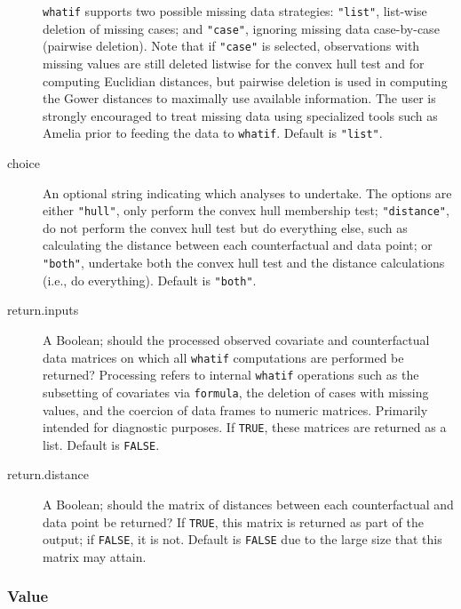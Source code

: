 \documentclass[oneside,letterpaper,titlepage]{article}
\begin{document}
\begin{description}
  \texttt{whatif} supports two possible missing data strategies:
  \texttt{"list"}, list-wise deletion of missing cases; and
  \texttt{"case"}, ignoring missing data case-by-case (pairwise
  deletion).  Note that if \texttt{"case"} is selected, observations
  with missing values are still deleted listwise for the convex hull
  test and for computing Euclidian distances, but pairwise deletion is
  used in computing the Gower distances to maximally use available
  information. The user is strongly encouraged to treat missing data
  using specialized tools such as Amelia prior to feeding the data to
  \texttt{whatif}.  Default is \texttt{"list"}.
\item[choice] An optional string indicating which analyses to 
  undertake. The options are either \texttt{"hull"}, only perform the convex hull 
  membership test; \texttt{"distance"}, do not perform the convex
  hull test but do everything else, such as calculating the distance between
  each counterfactual and data point; or \texttt{"both"}, undertake both the
  convex hull test and the distance calculations (i.e., do everything).
  Default is \texttt{"both"}.
\item[return.inputs] A Boolean; should the processed observed
  covariate and counterfactual data matrices on which all
  \texttt{whatif} computations are performed be returned?  Processing
  refers to internal \texttt{whatif} operations such as the subsetting
  of covariates via \texttt{formula}, the deletion of cases with
  missing values, and the coercion of data frames to numeric matrices.
  Primarily intended for diagnostic purposes.  If \texttt{TRUE}, these matrices
  are returned as a list.  Default is \texttt{FALSE}.
\item[return.distance] A Boolean; should the matrix of distances
  between each counterfactual and data point be returned?  If
  \texttt{TRUE}, this matrix is returned as part of the output; if
  \texttt{FALSE}, it is not.  Default is \texttt{FALSE} due to the large
  size that this matrix may attain.
\end{description}

\subsubsection{Value}
\end{document}
